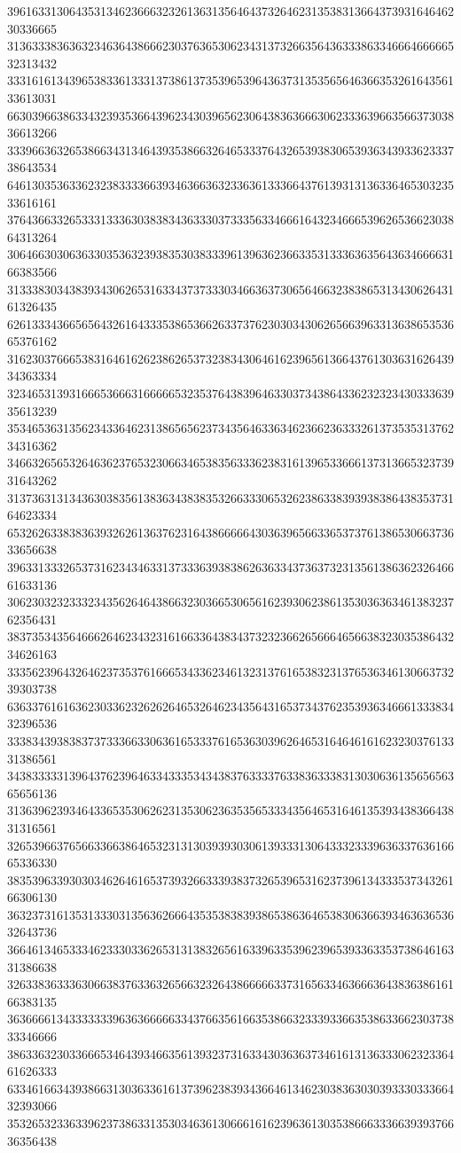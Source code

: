 39616331306435313462366632326136313564643732646231353831366437393164646230336665
31363338363632346364386662303763653062343137326635643633386334666466666532313432
33316161343965383361333137386137353965396436373135356564636635326164356133613031
66303966386334323935366439623430396562306438363666306233363966356637303836613266
33396636326538663431346439353866326465333764326539383065393634393362333738643534
64613035363362323833336639346366363233636133366437613931313633646530323533616161
37643663326533313336303838343633303733356334666164323466653962653662303864313264
30646630306363303536323938353038333961396362366335313336363564363466663166383566
31333830343839343062653163343737333034663637306564663238386531343062643161326435
62613334366565643261643335386536626337376230303430626566396331363865353665376162
31623037666538316461626238626537323834306461623965613664376130363162643934363334
32346531393166653666316666653235376438396463303734386433623232343033363935613239
35346536313562343364623138656562373435646336346236623633326137353531376234316362
34663265653264636237653230663465383563336238316139653366613731366532373931643262
31373631313436303835613836343838353266333065326238633839393838643835373164623334
65326263383836393262613637623164386666643036396566336537376138653066373633656638
39633133326537316234346331373336393838626363343736373231356138636232646661633136
30623032323332343562646438663230366530656162393062386135303636346138323762356431
38373534356466626462343231616633643834373232366265666465663832303538643234626163
33356239643264623735376166653433623461323137616538323137653634613066373239303738
63633761616362303362326262646532646234356431653734376235393634666133383432396536
33383439383837373336633063616533376165363039626465316464616162323037613331386561
34383333313964376239646334333534343837633337633836333831303063613565656365656136
31363962393464336535306262313530623635356533343564653164613539343836643831316561
32653966376566336638646532313130393930306139333130643332333963633763616665336330
38353963393030346264616537393266333938373265396531623739613433353734326166306130
36323731613531333031356362666435353838393865386364653830636639346363653632643736
36646134653334623330336265313138326561633963353962396539336335373864616331386638
32633836333630663837633632656632326438666663373165633463666364383638616166383135
36366661343333333963636666633437663561663538663233393366353863366230373833346666
38633632303366653464393466356139323731633430363637346161313633306232336461626333
63346166343938663130363361613739623839343664613462303836303039333033366432393066
35326532336339623738633135303463613066616162396361303538666333663939376636356438

